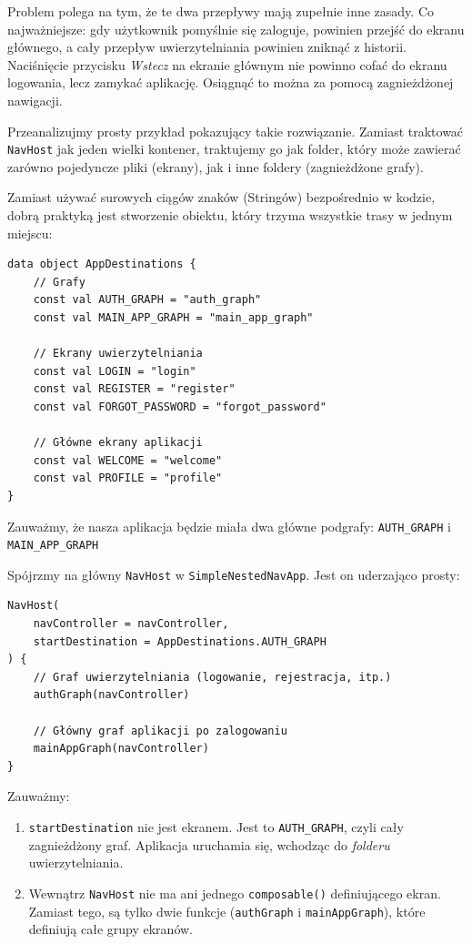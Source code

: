 Problem polega na tym, że te dwa przepływy mają zupełnie inne zasady. Co najważniejsze: gdy użytkownik pomyślnie się zaloguje, powinien przejść do ekranu głównego, a cały przepływ uwierzytelniania powinien zniknąć z historii. Naciśnięcie przycisku \textit{Wstecz} na ekranie głównym nie powinno cofać do ekranu logowania, lecz zamykać aplikację. Osiągnąć to można za pomocą zagnieżdżonej nawigacji.

Przeanalizujmy prosty przykład pokazujący takie rozwiązanie. Zamiast traktować \texttt{NavHost} jak jeden wielki kontener, traktujemy go jak folder, który może zawierać zarówno pojedyncze pliki (ekrany), jak i inne foldery (zagnieżdżone grafy).

Zamiast używać surowych ciągów znaków (Stringów) bezpośrednio w kodzie, dobrą praktyką jest stworzenie obiektu, który trzyma wszystkie trasy w jednym miejscu:

\begin{verbatim}
data object AppDestinations {
    // Grafy
    const val AUTH_GRAPH = "auth_graph"
    const val MAIN_APP_GRAPH = "main_app_graph"

    // Ekrany uwierzytelniania
    const val LOGIN = "login"
    const val REGISTER = "register"
    const val FORGOT_PASSWORD = "forgot_password"

    // Główne ekrany aplikacji
    const val WELCOME = "welcome"
    const val PROFILE = "profile"
}
\end{verbatim}

Zauważmy, że nasza aplikacja będzie miała dwa główne podgrafy: \texttt{AUTH\_GRAPH} i \texttt{MAIN\_APP\_GRAPH}

Spójrzmy na główny \texttt{NavHost} w \texttt{SimpleNestedNavApp}. Jest on uderzająco prosty:

\begin{verbatim}
NavHost(
    navController = navController,
    startDestination = AppDestinations.AUTH_GRAPH
) {
    // Graf uwierzytelniania (logowanie, rejestracja, itp.)
    authGraph(navController)

    // Główny graf aplikacji po zalogowaniu
    mainAppGraph(navController)
}
\end{verbatim}

Zauważmy:
\begin{enumerate}
\item \texttt{startDestination} nie jest ekranem. Jest to \texttt{AUTH\_GRAPH}, czyli cały zagnieżdżony graf. Aplikacja uruchamia się, wchodząc do \textit{folderu} uwierzytelniania.
\item Wewnątrz \texttt{NavHost} nie ma ani jednego \texttt{composable()} definiującego ekran. Zamiast tego, są tylko dwie funkcje (\texttt{authGraph} i \texttt{mainAppGraph}), które definiują całe grupy ekranów.
\end{enumerate}

